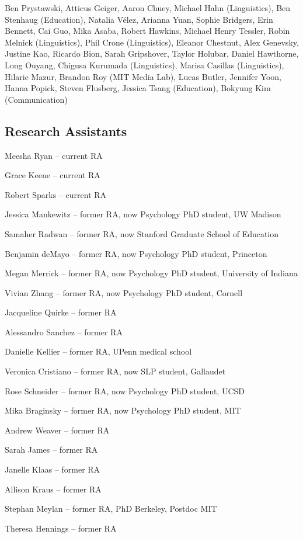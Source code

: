 \documentclass{article}
\renewenvironment{itemize}{
\begin{list}{}{
  \setlength{\leftmargin}{1.5em}
  }
  }{
\end{list}
}
\begin{document}
\begin{itemize}
  \item Ben Prystawski, Atticus Geiger, Aaron Chuey, Michael Hahn (Linguistics), Ben Stenhaug (Education), Natalia V\'elez, Arianna Yuan, Sophie Bridgers, Erin Bennett, Cai Guo, Mika Asaba, Robert Hawkins, Michael Henry Tessler, Robin Melnick (Linguistics), Phil Crone (Linguistics), Eleanor Chestnut, Alex Genevsky, Justine Kao, Ricardo Bion, Sarah Gripshover, Taylor Holubar, Daniel Hawthorne, Long Ouyang, Chigusa Kurumada (Linguistics), Marisa Casillas (Linguistics), Hilarie Mazur, Brandon Roy (MIT Media Lab), Lucas Butler, Jennifer Yoon, Hanna Popick, Steven Flusberg, Jessica Tsang (Education), Bokyung Kim (Communication)
\end{itemize}

\subsection*{Research Assistants}
\begin{itemize}
  \item Meesha Ryan -- current RA
  \item Grace Keene -- current RA
  \item Robert Sparks -- current RA
  \item Jessica Mankewitz -- former RA, now Psychology PhD student, UW Madison
  \item Samaher Radwan -- former RA, now Stanford Graduate School of Education
  \item Benjamin deMayo -- former RA, now Psychology PhD student, Princeton
  \item Megan Merrick -- former RA, now Psychology PhD student, University of Indiana
  \item Vivian Zhang -- former RA, now Psychology PhD student, Cornell
  \item Jacqueline Quirke -- former RA
  \item Alessandro Sanchez -- former RA
  \item Danielle Kellier -- former RA, UPenn medical school
  \item Veronica Cristiano -- former RA, now SLP student, Gallaudet
  \item Rose Schneider -- former RA, now Psychology PhD student, UCSD
  \item Mika Braginsky -- former RA, now Psychology PhD student, MIT
  \item Andrew Weaver -- former RA
  \item Sarah James -- former RA
  \item Janelle Klaas -- former RA
  \item Allison Kraus -- former RA
  \item Stephan Meylan -- former RA, PhD Berkeley, Postdoc MIT
  \item Theresa Hennings -- former RA
\end{itemize}
\end{document}
